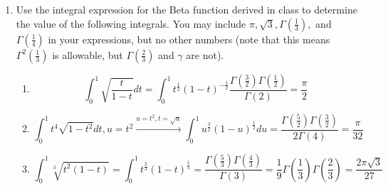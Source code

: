 \documentclass{article}
\begin{document}
\begin{enumerate}
\begin{enumerate}
        \item Use the manipulations you performed in parts (b) and (c) of problem 1 to write a Maclaurin expansion of the form $\sum_{0}^{\infty}c_k\varepsilon^k$ for the integral in part (a). Your coefficients will contain integrals involving $x$. Note that you do \textit{not} want powers of $(1+\varepsilon)$. You want powers of $\varepsilon$.
        \\
        \[\int_{0}^{\infty} x^{1+\varepsilon}e^{-3x}dx = \int_{0}^{\infty} x\left( \sum_{k=0}^{\infty} \frac{\ln^k x}{k!}\varepsilon^k\right)e^{-3x}dx = \boxed{\sum_{k=0}^{\infty} \left(\frac{1}{k!}\int_{0}^{\infty} xe^{-3x}\ln^kxdx\right)\varepsilon^k}\]
        \item Use your results from parts (c) and (d) along with those from problem 1 to determine the value of the integral $\int_{0}^{\infty} e^{-3x}x\ln^2xdx$. Your result should be written in terms of the irrational number $\gamma, \pi, $ and $\ln 3$ only, along with rational numbers.
        \\\[\int_{0}^{\infty}e^{-3x}x\ln^2xdx = 2!c_2 = \boxed{\frac 1 9 \left(\frac{\pi^2}{6}+(\gamma + \ln 3)^2 - 2\gamma -2\ln 3 \right)}\]
    \end{enumerate}
    \item Use the integral expression for the Beta function derived in class to determine the value of the following integrals. You may include $\pi, \sqrt 3,\Gamma(\frac 1 3),$ and $\Gamma(\frac 1 4)$ in your expressions, but no other numbers (note that this means $\Gamma^2(\frac 1 3)$ is allowable, but $\Gamma(\frac 2 3)$ and $\gamma$ are not).
    \begin{enumerate}
        \item \[\int_{0}^{1} \sqrt{\frac{t}{1-t}}dt = \int_{0}^{1}t^{\frac 1 2}(1-t)^{-\frac 1 2}\frac{\Gamma(\frac 3 2)\Gamma(\frac 1 2)}{\Gamma(2)}= \boxed{\frac{\pi}{2}}\]
        \item \[\int_{0}^{1}t^4\sqrt{1-t^2}dt, u = t^2 \xrightarrow{u=t^2, t=\sqrt u}\int_{0}^{1}u^{\frac 3 2}(1-u)^{\frac 1 2}du = \frac{\Gamma(\frac 5 2)\Gamma(\frac 3 2)}{2\Gamma(4)} = \boxed{\frac{\pi}{32}}\]
        \item \[\int_{0}^{1}\sqrt[3]{t^2(1-t)} = \int_{0}^{1} t^{\frac 2 3}(1-t)^{\frac 1 3} = \frac{\Gamma(\frac 5 3)\Gamma(\frac 4 3)}{\Gamma(3)} = \frac 1 9 \Gamma(\frac 1 3)\Gamma(\frac 2 3) = \boxed{\frac{2\pi\sqrt3}{27}}\]
    \end{enumerate}
\end{enumerate}
\end{document}
